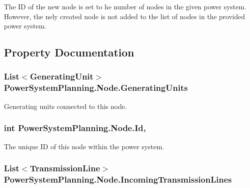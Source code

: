The ID of the new node is set to he number of nodes in the given power system. However, the nely created node is not added to the list of nodes in the provided power system.

\subsection{Property Documentation}
\subsubsection[{\texorpdfstring{Generating\+Units}{GeneratingUnits}}]{\setlength{\rightskip}{0pt plus 5cm}List$<${\bf Generating\+Unit}$>$ Power\+System\+Planning.\+Node.\+Generating\+Units\hspace{0.3cm}{\ttfamily [get]}}\hypertarget{class_power_system_planning_1_1_node_ae781a2962ffb2beaba540f4b2f439963}{}\label{class_power_system_planning_1_1_node_ae781a2962ffb2beaba540f4b2f439963}


Generating units connected to this node. 

\subsubsection[{\texorpdfstring{Id}{Id}}]{\setlength{\rightskip}{0pt plus 5cm}int Power\+System\+Planning.\+Node.\+Id\hspace{0.3cm}{\ttfamily [get]}, {\ttfamily [set]}}\hypertarget{class_power_system_planning_1_1_node_abd72649e4b2b83daa0980ab87a90034a}{}\label{class_power_system_planning_1_1_node_abd72649e4b2b83daa0980ab87a90034a}


The unique ID of this node within the power system. 

\subsubsection[{\texorpdfstring{Incoming\+Transmission\+Lines}{IncomingTransmissionLines}}]{\setlength{\rightskip}{0pt plus 5cm}List$<${\bf Transmission\+Line}$>$ Power\+System\+Planning.\+Node.\+Incoming\+Transmission\+Lines\hspace{0.3cm}{\ttfamily [get]}}\hypertarget{class_power_system_planning_1_1_node_a6b851f2b0cce15e7d245b40b43424a2d}{}\label{class_power_system_planning_1_1_node_a6b851f2b0cce15e7d245b40b43424a2d}


